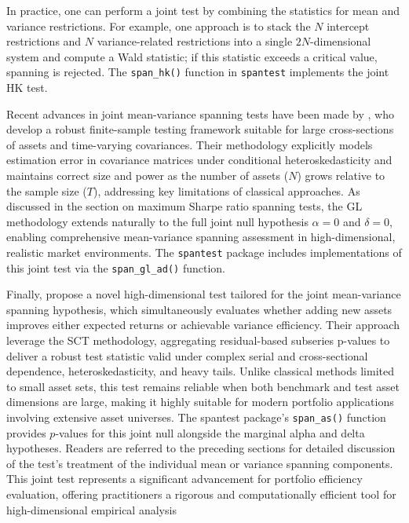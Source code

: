 In practice, one can perform a joint test by combining the statistics
for mean and variance restrictions. For example, one approach is to
stack the \(N\) intercept restrictions and \(N\) variance-related
restrictions into a single \(2N\)-dimensional system and compute a Wald
statistic; if this statistic exceeds a critical value, spanning is
rejected. The \texttt{span\_hk()} function in \texttt{spantest} implements the joint HK
test.

Recent advances in joint mean-variance spanning tests have been made by
\citet{GungorLuger2016}, who develop a robust finite-sample testing framework
suitable for large cross-sections of assets and time-varying
covariances. Their methodology explicitly models estimation error in
covariance matrices under conditional heteroskedasticity and maintains
correct size and power as the number of assets (\(N\)) grows relative to
the sample size (\(T\)), addressing key limitations of classical
approaches. As discussed in the section on maximum Sharpe ratio spanning
tests, the GL methodology extends naturally to the full joint null
hypothesis \(\alpha = 0\) and \(\delta = 0\), enabling comprehensive
mean-variance spanning assessment in high-dimensional, realistic market
environments. The \texttt{spantest} package includes implementations of this
joint test via the \texttt{span\_gl\_ad()} function.

Finally, \citet{ArdiaSessinou2025} propose a novel high-dimensional test
tailored for the joint mean-variance spanning hypothesis, which
simultaneously evaluates whether adding new assets improves either
expected returns or achievable variance efficiency. Their approach
leverage the SCT methodology, aggregating residual-based subseries
p-values to deliver a robust test statistic valid under complex serial
and cross-sectional dependence, heteroskedasticity, and heavy tails.
Unlike classical methods limited to small asset sets, this test remains
reliable when both benchmark and test asset dimensions are large, making
it highly suitable for modern portfolio applications involving extensive
asset universes. The spantest package's \texttt{span\_as()} function provides
\(p\)-values for this joint null alongside the marginal alpha and delta
hypotheses. Readers are referred to the preceding sections for detailed
discussion of the test's treatment of the individual mean or variance
spanning components. This joint test represents a significant
advancement for portfolio efficiency evaluation, offering practitioners
a rigorous and computationally efficient tool for high-dimensional
empirical analysis

